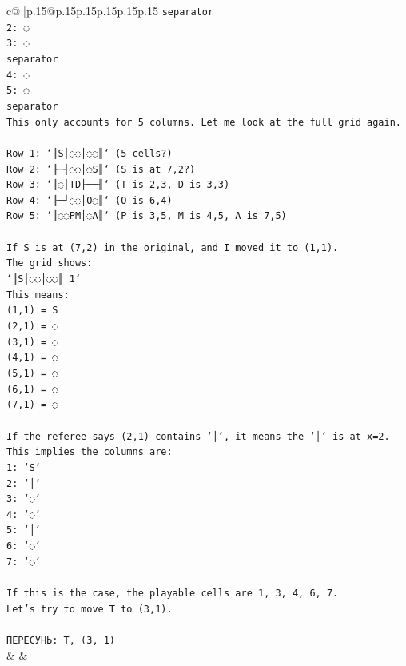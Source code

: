 \documentclass{article}
\begin{document}
{\begin{supertabular}{c@{$\;$}|p{.15\linewidth}@{}p{.15\linewidth}p{.15\linewidth}p{.15\linewidth}p{.15\linewidth}p{.15\linewidth}}
{{{\texttt{separator} \\
\texttt{2: ◌} \\
\texttt{3: ◌} \\
\texttt{separator} \\
\texttt{4: ◌} \\
\texttt{5: ◌} \\
\texttt{separator} \\
\texttt{This only accounts for 5 columns. Let me look at the full grid again.} \\
\\ 
\texttt{Row 1: `║S│◌◌│◌◌║` (5 cells?)} \\
\texttt{Row 2: `╟─┤◌◌│◌S║` (S is at 7,2?)} \\
\texttt{Row 3: `║◌│TD├──╢` (T is 2,3, D is 3,3)} \\
\texttt{Row 4: `╟─┘◌◌│O◌║` (O is 6,4)} \\
\texttt{Row 5: `║◌◌PM│◌A║` (P is 3,5, M is 4,5, A is 7,5)} \\
\\ 
\texttt{If S is at (7,2) in the original, and I moved it to (1,1).} \\
\texttt{The grid shows:} \\
\texttt{`║S│◌◌│◌◌║ 1`} \\
\texttt{This means:} \\
\texttt{(1,1) = S} \\
\texttt{(2,1) = ◌} \\
\texttt{(3,1) = ◌} \\
\texttt{(4,1) = ◌} \\
\texttt{(5,1) = ◌} \\
\texttt{(6,1) = ◌} \\
\texttt{(7,1) = ◌} \\
\\ 
\texttt{If the referee says (2,1) contains `│`, it means the `│` is at x=2.} \\
\texttt{This implies the columns are:} \\
\texttt{1: `S`} \\
\texttt{2: `│`} \\
\texttt{3: `◌`} \\
\texttt{4: `◌`} \\
\texttt{5: `│`} \\
\texttt{6: `◌`} \\
\texttt{7: `◌`} \\
\\ 
\texttt{If this is the case, the playable cells are 1, 3, 4, 6, 7.} \\
\texttt{Let's try to move T to (3,1).} \\
\\ 
\texttt{ПЕРЕСУНЬ: T, (3, 1)} \\
            }
        }
    }
    & & \\ \\


\end{supertabular}}
\end{document}
